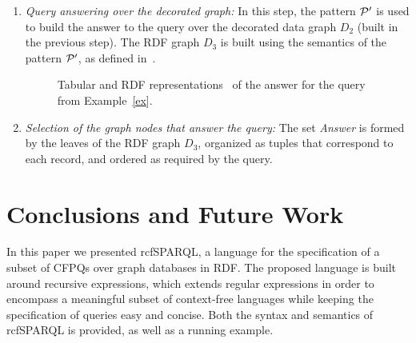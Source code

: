 \documentclass[runningheads]{llncs}
\begin{document}
\begin{enumerate}
    \item \textit{Query answering over the decorated graph:} In this step, the pattern ${\cal P}'$ is used to build the answer to the query over the decorated data graph $D_2$ (built in the previous step).
    The RDF graph $D_3$ is built using the semantics of the pattern ${\cal P}'$, as defined in~\cite{MEDEIROS2019}.
    
    \smallskip
    \begin{figure}[h]
        \centering
        
        \caption{Tabular and RDF representations~\cite{MEDEIROS2019} of the answer for the query from Example~\ref{ex}.}
        \label{fig:ex-tableRDF}
    \end{figure}
    \smallskip
    
    \item \textit{Selection of the graph nodes that answer the query:} The set \emph{Answer} is formed by the leaves of the RDF graph $D_3$, organized as tuples that correspond to each record, and ordered as required by the query.
    
    \smallskip
    \smallskip
\end{enumerate}




\section{Conclusions and Future Work}
\label{sec:conclusions}

In this paper we presented \textsf{rcfSPARQL}, a language for the specification of a  subset of CFPQs over graph databases in RDF. 
The proposed language is built around recursive expressions, which extends regular expressions in order to encompass 
a meaningful subset of  context-free languages while keeping the specification of queries easy and concise.
Both the syntax and semantics of \textsf{rcfSPARQL} is provided, as well as a running example. 
\end{document}
